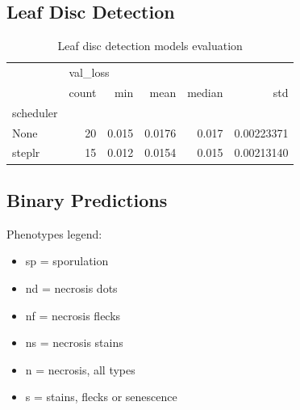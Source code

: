 \documentclass[english]{article}
\begin{document}
\subsection{Leaf Disc Detection}

\begin{table}[H]
\centering
\caption{Leaf disc detection models evaluation}
\label{tab:leafdiscdetectionresult}
\begin{tabular}{lrrrrr}
\toprule
{} & \multicolumn{5}{l}{val\_loss} \\
{} &    count &    min &    mean & median &         std \\
scheduler &          &        &         &        &             \\
\midrule
None      &       20 &  0.015 &  0.0176 &  0.017 &  0.00223371 \\
steplr    &       15 &  0.012 &  0.0154 &  0.015 &  0.00213140 \\
\bottomrule
\end{tabular}
\end{table}

\subsection{Binary Predictions}

Phenotypes legend:
\begin{itemize}
    \item sp = sporulation
    \item nd = necrosis dots
    \item nf = necrosis flecks
    \item ns = necrosis stains
    \item n = necrosis, all types
    \item s = stains, flecks or senescence
\end{itemize}
\end{document}
